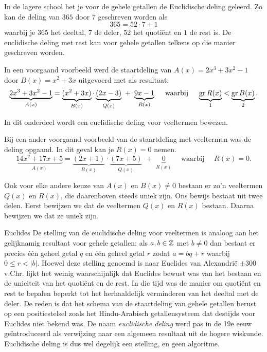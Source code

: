 \documentclass{ximera}
\begin{document}
	\author{Koen de Naeghel - Wiskunde Op Maat}
    \xmsource



In de lagere school het je voor de gehele getallen de Euclidische deling geleerd. Zo kan de deling van $365$ door $7$ geschreven worden als
\[
365 = 52 \cdot 7 + 1
\]
waarbij je $365$ het deeltal, $7$ de deler, $52$ het quotiënt en $1$ de rest is. De euclidische deling met rest kan voor gehele getallen telkens op die manier geschreven worden. 


In een voorgaand voorbeeld werd de staartdeling van $A(x) = 2x^3+3x^2-1$ door $B(x) = x^2+3x$ uitgevoerd met als resultaat: 
\[
\underbrace{2x^3+3x^2-1}_{A(x)} = \underbrace{(x^2+3x)}_{B(x)}\cdot\underbrace{(2x-3)}_{Q(x)} \,\, + \,\, \underbrace{9x-1}_{R(x)} \quad \text{ waarbij } \quad \underbrace{\operatorname{gr} R(x)}_{1} < \underbrace{\operatorname{gr} B(x)}_{2}.
\]

In dit onderdeel wordt een euclidische deling voor veeltermen bewezen.


Bij een ander voorgaand voorbeeld van de staartdeling met veeltermen was de deling opgaand. In dit geval kan je \( R(x) = 0\) nemen. 
\[
\underbrace{14x^2+17x+5}_{A(x)} = \underbrace{(2x+1)}_{B(x)}\cdot\underbrace{(7x+5)}_{Q(x)} \,\, + \,\, \underbrace{0}_{R(x)} \quad \text{ waarbij } \quad R(x) = 0.
\]

Ook voor elke andere keuze van $A(x)$ en $B(x) \neq 0$ bestaan er zo'n veeltermen $Q(x)$ en $R(x)$, die daarenboven steeds uniek zijn. Ons bewijs bestaat uit twee delen. Eerst bewijzen we dat de veeltermen $Q(x)$ en $R(x)$ bestaan. Daarna bewijzen we dat ze uniek zijn. 


\begin{xmuitweiding}{Euclides}
De stelling van de euclidische deling voor veeltermen is analoog aan het gelijknamig resultaat voor gehele getallen: als $a,b \in \mathbb{Z}$ met $b \neq 0$ dan bestaat er precies één geheel getal $q$ en één geheel getal $r$ zodat $a = bq + r$ waarbij $0 \leq r < \left|b\right|$. Hoewel deze stelling genoemd is naar Euclides van Alexandrië $\pm$300 v.Chr. lijkt het weinig waarschijnlijk dat Euclides bewust was van het bestaan en de uniciteit van het quotiënt en de rest. In die tijd was de manier om quotiënt en rest te bepalen beperkt tot het herhaaldelijk verminderen van het deeltal met de deler. De reden is dat het schema van de staartdeling van gehele getallen berust op een positiestelsel zoals het Hindu-Arabisch getallensysteem dat destijds voor Euclides niet bekend was. De naam \textit{ euclidische deling} werd pas in de 19e eeuw geïntroduceerd als verwijzing naar een algemeen resultaat uit de hogere wiskunde. Euclidische deling is dus wel degelijk een stelling, en geen algoritme.
\end{xmuitweiding}
\end{document}
